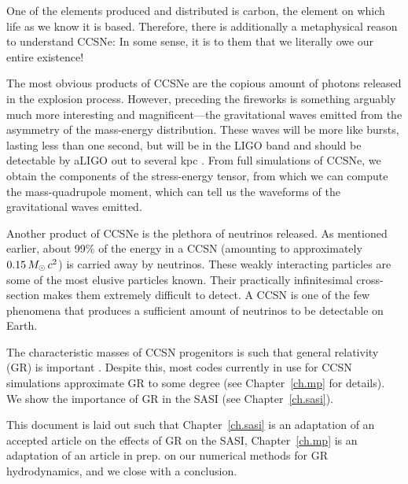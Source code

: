 One of the elements produced and distributed is carbon,
the element on which life as we know it is based.
Therefore, there is additionally
a metaphysical reason to understand CCSNe:
In some sense, it is to them that we literally owe our entire existence!

The most obvious products of CCSNe are the copious amount of photons
released in the explosion process.
However, preceding the fireworks is something arguably much more interesting
and magnificent---the gravitational waves emitted from the asymmetry of the
mass-energy distribution.
These waves will be more like bursts, lasting less than one second,
but will be in the LIGO band and should be detectable by aLIGO
out to several kpc \citep{aaa2016}.
From full simulations of CCSNe, we obtain the components of the stress-energy
tensor, from which we can compute the mass-quadrupole moment,
which can tell us the waveforms of the gravitational waves emitted.

Another product of CCSNe is the plethora of neutrinos released.
As mentioned earlier, about 99\% of the energy in a CCSN
(amounting to approximately $0.15\,M_{\odot}\,c^{2}$) is carried away by neutrinos.
These weakly interacting particles are some of the most elusive particles known.
Their practically infinitesimal cross-section makes them extremely difficult
to detect.
A CCSN is one of the few phenomena that produces a sufficient amount of
neutrinos to be detectable on Earth.

The characteristic masses of CCSN progenitors is such that general relativity
(GR) is important \citep[e.g., see][]{lmt2001}.
Despite this, most codes currently in use for CCSN simulations
approximate GR to some degree (see Chapter~\ref{ch.mp} for details).
We show the importance of GR in the SASI (see Chapter~\ref{ch.sasi}).

This document is laid out such that Chapter~\ref{ch.sasi} is an adaptation
of an accepted article on the effects of GR on the SASI,
Chapter~\ref{ch.mp} is an adaptation of an article in prep. on our
numerical methods for GR hydrodynamics,
and we close with a conclusion.

